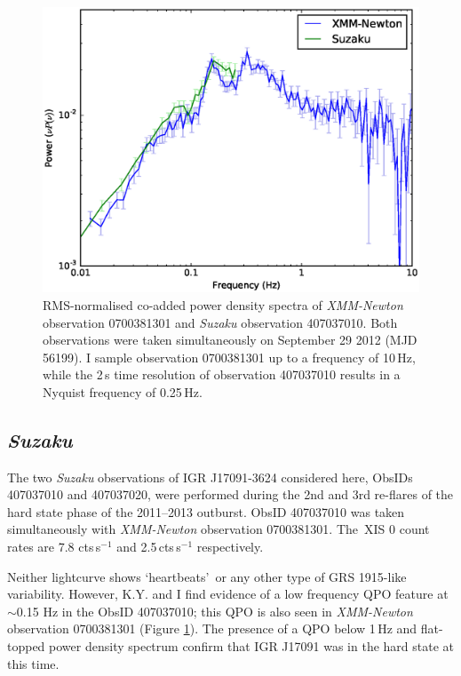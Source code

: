 \begin{figure}
    \includegraphics[width=0.9\columnwidth, trim = 0cm 0cm 0.5cm 1.0cm, clip]{images/multipower.eps}
    \captionsetup{singlelinecheck=off}
    \caption[$\nu P(\nu)$-normalised co-added power density spectra of \textit{XMM-Newton} observation 0700381301 and \textit{Suzaku} observation 407037010.]{RMS-normalised co-added power density spectra of \indexxmm\textit{XMM-Newton} observation 0700381301 and \indexsuzaku\textit{Suzaku} observation 407037010.  Both observations were taken simultaneously on September 29 2012 (MJD 56199).  I sample observation 0700381301 up to a frequency of 10\,Hz, while the 2\,s time resolution of observation 407037010 results in a Nyquist frequency of 0.25\,Hz.}
   \label{fig:xmmqpo}
\end{figure}

\subsection{\textit{Suzaku}}

\par The two \indexsuzaku\textit{Suzaku} observations of IGR J17091-3624 considered here, ObsIDs 407037010 and 407037020, were performed during the 2nd and 3rd re-flares of the hard state phase of the 2011--2013 outburst.  ObsID 407037010 was taken simultaneously with \indexxmm\textit{XMM-Newton} observation 0700381301.  The\indexxis\ XIS 0 count rates are 7.8 cts\,s$^{-1}$ and 2.5\,cts\,s$^{-1}$ respectively.
\par Neither lightcurve shows `heartbeats'\indexrho\ or any other type of GRS 1915-like variability.  However, \textsf{K.Y.} and I find evidence of a low frequency QPO feature at $\sim$0.15 Hz in the ObsID 407037010; this QPO is also seen in \indexxmm\textit{XMM-Newton} observation 0700381301 (Figure \ref{fig:xmmqpo}).  The presence of a QPO below 1\,Hz and flat-topped power density spectrum confirm that IGR J17091 was in the hard state at this time.

